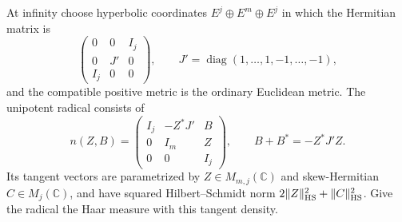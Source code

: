 At infinity choose hyperbolic coordinates
$E^j\oplus E^m\oplus E^j$ in which the Hermitian matrix is
\[
 \begin{pmatrix}0&0&I_j\\0&J'&0\\I_j&0&0\end{pmatrix},
 \qquad J'=\operatorname{diag}(1,\ldots,1,-1,\ldots,-1),
\]
and the compatible positive metric is the ordinary
Euclidean metric.  The unipotent radical consists of
\[
 n(Z,B)=
 \begin{pmatrix}
 I_j&-Z^*J'&B\\
 0&I_m&Z\\
 0&0&I_j
 \end{pmatrix},
                  \qquad B+B^*=-Z^*J'Z.
\]
Its tangent vectors are parametrized by $Z\in M_{m,j}(\mathbb C)$
and skew-Hermitian $C\in M_j(\mathbb C)$, and have
squared Hilbert--Schmidt norm
$2\|Z\|_{\rm HS}^2+\|C\|_{\rm HS}^2$.
Give the radical the Haar measure with this tangent density.

